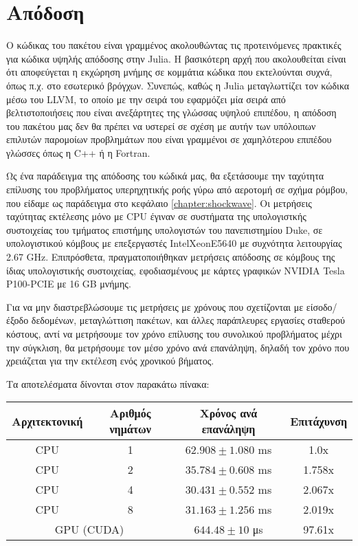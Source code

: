 \section{Απόδοση}

Ο κώδικας του πακέτου είναι γραμμένος ακολουθώντας τις προτεινόμενες πρακτικές για κώδικα υψηλής απόδοσης στην Julia.
Η βασικότερη αρχή που ακολουθείται είναι ότι αποφεύγεται η εκχώρηση μνήμης σε κομμάτια κώδικα που εκτελούνται συχνά, όπως π.χ. στο εσωτερικό βρόγχων.
Συνεπώς, καθώς η Julia μεταγλωττίζει τον κώδικα μέσω του LLVM, το οποίο με την σειρά του εφαρμόζει μία σειρά από βελτιστοποιήσεις που είναι ανεξάρτητες της γλώσσας υψηλού επιπέδου, η απόδοση του πακέτου μας δεν θα πρέπει να υστερεί σε σχέση με αυτήν των υπόλοιπων επιλυτών παρομοίων προβλημάτων που είναι γραμμένοι σε χαμηλότερου επιπέδου γλώσσες όπως η C++ ή η Fortran.

Ως ένα παράδειγμα της απόδοσης του κώδικά μας, θα εξετάσουμε την ταχύτητα επίλυσης του προβλήματος υπερηχητικής ροής γύρω από αεροτομή σε σχήμα ρόμβου, που είδαμε ως παράδειγμα στο κεφάλαιο \ref{chapter:shockwave}.
Οι μετρήσεις ταχύτητας εκτέλεσης μόνο με CPU έγιναν σε συστήματα της υπολογιστκής συστοιχείας του τμήματος επιστήμης υπολογιστών του πανεπιστημίου Duke, σε υπολογιστικού κόμβους με επεξεργαστές Intel\textregistered  Xeon\textregistered  E5640 με συχνότητα λειτουργίας 2.67 GHz.
Επιπρόσθετα, πραγματοποιήθηκαν μετρήσεις απόδοσης σε κόμβους της ίδιας υπολογιστικής συστοιχείας, εφοδιασμένους με κάρτες γραφικών NVIDIA Tesla P100-PCIE με 16 GB μνήμης.

Για να μην διαστρεβλώσουμε τις μετρήσεις με χρόνους που σχετίζονται με είσοδο/έξοδο δεδομένων, μεταγλώττιση πακέτων, και άλλες παράπλευρες εργασίες σταθερού κόστους, αντί να μετρήσουμε τον χρόνο επίλυσης του συνολικού προβλήματος μέχρι την σύγκλιση, θα μετρήσουμε τον μέσο χρόνο ανά επανάληψη, δηλαδή τον χρόνο που χρειάζεται για την εκτέλεση ενός χρονικού βήματος.

Τα αποτελέσματα δίνονται στον παρακάτω πίνακα:

\begin{center}
    \begin{tabular}{|c|c|c|c| }
        \hline
        Αρχιτεκτονική & Αριθμός νημάτων & Χρόνος ανά επανάληψη & Επιτάχυνση \\
        \hline
        CPU & 1 & $62.908 \pm 1.080$ ms & 1.0x \\
        CPU & 2 & $35.784 \pm 0.608$ ms & 1.758x \\
        CPU & 4 & $30.431 \pm 0.552$ ms & 2.067x \\
        CPU & 8 & $31.163 \pm 1.256$ ms & 2.019x \\
        \hline
        \multicolumn{2}{|c|}{GPU (CUDA)} & $644.48 \pm 10 $ μs & 97.61x \\
        \hline
    \end{tabular}
\end{center}

